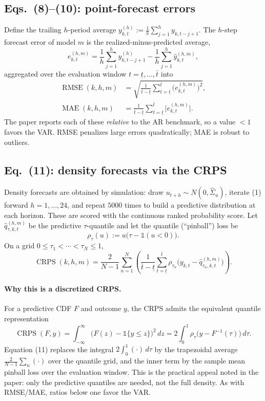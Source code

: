 \documentclass[11pt]{article}
\newcommand{\Id}{\mathbb{1}}
\DeclareMathOperator{\RMSE}{RMSE}
\DeclareMathOperator{\MAE}{MAE}
\DeclareMathOperator{\CRPS}{CRPS}
\theoremstyle{remark}
\begin{document}
\subsection*{Eqs.~(8)--(10): point-forecast errors}
Define the trailing $h$-period average
$y^{(h)}_{k,t}:=\tfrac1h\sum_{j=1}^{h}y_{k,t-j+1}$. The $h$-step forecast error of
model $m$ is the realized-minus-predicted average,
\begin{equation}
e^{(h,m)}_{k,t}
=\frac1h\sum_{j=1}^{h}y^{(h)}_{k,t-j+1}
-\frac1h\sum_{j=1}^{h}\hat y^{(h,m)}_{k,t}, \tag{8}
\end{equation}
aggregated over the evaluation window $t=\underline t,\dots,\bar t$ into
\begin{align}
\RMSE(k,h,m)&=\sqrt{\frac{1}{\bar t-\underline t}\sum_{t=\underline t}^{\bar t}
\big(e^{(h,m)}_{k,t}\big)^2}, \tag{9}\\[2pt]
\MAE(k,h,m)&=\frac{1}{\bar t-\underline t}\sum_{t=\underline t}^{\bar t}
\big|e^{(h,m)}_{k,t}\big|. \tag{10}
\end{align}
The paper reports each of these \emph{relative} to the AR benchmark, so a value
$<1$ favors the VAR. RMSE penalizes large errors quadratically; MAE is robust to
outliers.

\subsection*{Eq.~(11): density forecasts via the CRPS}
Density forecasts are obtained by simulation: draw
$u_{t+h}\sim N(0,\hat\Sigma_u)$, iterate (1) forward $h=1,\dots,24$, and repeat
$5000$ times to build a predictive distribution at each horizon. These are scored
with the continuous ranked probability score. Let $\hat q^{(h,m)}_{\tau,k,t}$ be
the predictive $\tau$-quantile and let the quantile (``pinball'') loss be
\[
\rho_\tau(u):=u\big(\tau-\Id(u<0)\big).
\]
On a grid $0\le\tau_1<\cdots<\tau_N\le 1$,
\begin{equation}
\CRPS(k,h,m)=\frac{2}{N-1}\sum_{n=1}^{N}
\left(\frac{1}{\bar t-\underline t}\sum_{t=\underline t}^{\bar t}
\rho_{\tau_n}\!\big(y_{k,t}-\hat q^{(h,m)}_{\tau_n,k,t}\big)\right). \tag{11}
\end{equation}

\paragraph{Why this is a discretized CRPS.} For a predictive CDF $F$ and outcome
$y$, the CRPS admits the equivalent quantile representation
\[
\CRPS(F,y)=\int_{-\infty}^{\infty}\!\big(F(z)-\Id\{y\le z\}\big)^2\,dz
=2\int_0^1\rho_\tau\!\big(y-F^{-1}(\tau)\big)\,d\tau .
\]
Equation (11) replaces the integral $2\int_0^1(\cdot)\,d\tau$ by the trapezoidal
average $\tfrac{2}{N-1}\sum_n(\cdot)$ over the quantile grid, and the inner term
by the sample mean pinball loss over the evaluation window. This is the practical
appeal noted in the paper: only the predictive quantiles are needed, not the full
density. As with RMSE/MAE, ratios below one favor the VAR.
\end{document}
